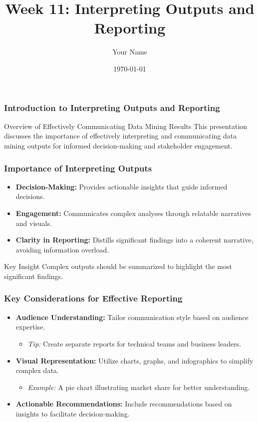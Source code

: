 \documentclass{beamer}
\title{Week 11: Interpreting Outputs and Reporting}
\author{Your Name}
\institute{Your Institution}
\date{\today}
\begin{document}
\frame{\titlepage}

\begin{frame}[fragile]
    \frametitle{Introduction to Interpreting Outputs and Reporting}
    \begin{block}{Overview of Effectively Communicating Data Mining Results}
        This presentation discusses the importance of effectively interpreting and communicating data mining outputs for informed decision-making and stakeholder engagement.
    \end{block}
\end{frame}

\begin{frame}[fragile]
    \frametitle{Importance of Interpreting Outputs}
    \begin{itemize}
        \item \textbf{Decision-Making:} Provides actionable insights that guide informed decisions.
        \item \textbf{Engagement:} Communicates complex analyses through relatable narratives and visuals. 
        \item \textbf{Clarity in Reporting:} Distills significant findings into a coherent narrative, avoiding information overload.
    \end{itemize}
    \begin{block}{Key Insight}
        Complex outputs should be summarized to highlight the most significant findings.
    \end{block}
\end{frame}

\begin{frame}[fragile]
    \frametitle{Key Considerations for Effective Reporting}
    \begin{itemize}
        \item \textbf{Audience Understanding:} Tailor communication style based on audience expertise.
            \begin{itemize}
                \item \textit{Tip:} Create separate reports for technical teams and business leaders.
            \end{itemize}
        \item \textbf{Visual Representation:} Utilize charts, graphs, and infographics to simplify complex data.
            \begin{itemize}
                \item \textit{Example:} A pie chart illustrating market share for better understanding.
            \end{itemize}
        \item \textbf{Actionable Recommendations:} Include recommendations based on insights to facilitate decision-making.
    \end{itemize}
\end{frame}
\end{document}
